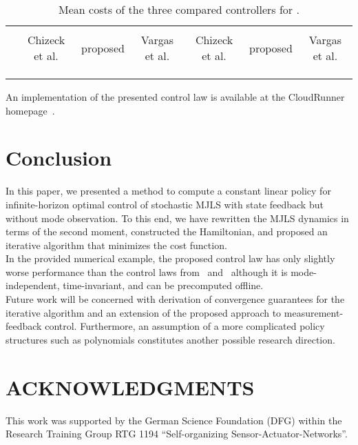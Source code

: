 \documentclass[preprint,1p,11pt]{IR-Template/ISAS_IR}
\begin{document}
\begin{table}[h]
\centering
\begin{tabular}{ccccccc}
\toprule
& \multicolumn{3}{c}{} & \multicolumn{3}{c}{}\\ \cmidrule{2-7}
& Chizeck et al. & proposed & Vargas et al.& Chizeck et al. & proposed & Vargas et al.\\\cmidrule{1-7}
\multicolumn{1}{c}{}&  &  &  &  &  &  \\
\cmidrule{1-7}
\multicolumn{1}{c}{}&  &  &  &  &  &  \\
\cmidrule{1-7}
\multicolumn{1}{c}{}&  &  &  &  &  &  \\
\bottomrule
\end{tabular}
\caption{Mean costs of the three compared controllers for .}
\label{tab:Costs_2}
\end{table}

An implementation of the presented control law is available at the CloudRunner homepage~\cite{Cloudrunner}.    	
   \section{Conclusion}
   	\label{sec:Conclusion}
   	In this paper, we presented a method to compute a constant linear policy for infinite-horizon optimal control of stochastic MJLS with state feedback but without mode observation. To this end, we have rewritten the MJLS dynamics in terms of the second moment, constructed the Hamiltonian, and proposed an iterative algorithm that minimizes the cost function.\\

In the provided numerical example, the proposed control law has only slightly worse performance than the control laws from~\cite{Vargas_2013} and~\cite{Chizeck_1986} although it is mode-independent, time-invariant, and can be precomputed offline.\\

Future work will be concerned with derivation of convergence guarantees for the iterative algorithm and an extension of the proposed approach to measurement-feedback control. Furthermore, an assumption of a more complicated policy structures such as polynomials constitutes another possible research direction.    	
   \section{ACKNOWLEDGMENTS}
This work was supported by the German Science Foundation
   (DFG) within the Research Training Group RTG 1194 ``Self-organizing Sensor-Actuator-Networks''.
   	
\end{document}
